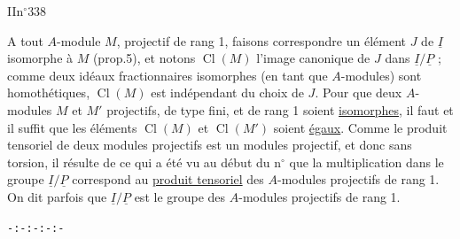 
II\hfill{}\hfill n$^\circ$338

A tout $A$-module $M$, projectif de rang 1, faisons correspondre un élément
$J$ de $\underline I$ isomorphe à $M$ (prop.5), et notons $\operatorname{Cl}(M)$ l'image canonique de $J$ dans
$\underline I/\underline P$ ; comme deux idéaux fractionnaires isomorphes (en tant que $A$-modules)
sont homothétiques, $\operatorname{Cl}(M)$ est indépendant du choix de $J$. Pour que deux
$A$-modules $M$ et $M'$ projectifs, de type fini, et de rang 1 soient \uline{isomorphes},
il faut et il suffit que les éléments $\operatorname{Cl}(M)$ et $\operatorname{Cl}(M')$ soient \uline{égaux}. Comme
le produit tensoriel de deux modules projectifs est un modules projectif, et
donc sans torsion, il résulte de ce qui a été vu au début du n$^\circ$ que la multiplication
dans le groupe $\underline I/\underline P$ correspond au \uline{produit tensoriel} des $A$-modules
projectifs de rang 1. On dit parfois que $\underline I/\underline P$ est le groupe des $A$-modules
projectifs de rang 1.

\begin{center}\texttt{-:-:-:-:-}\end{center}

